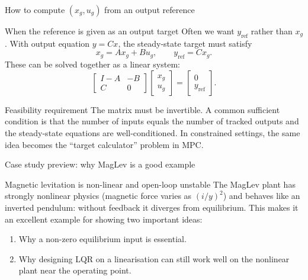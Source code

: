 \documentclass[aspectratio=169,11pt]{beamer}
\begin{document}
\begin{frame}{How to compute $(x_g,u_g)$ from an output reference}
\begin{block}{When the reference is given as an output target}
Often we want $y_{\mathrm{ref}}$ rather than $x_g$. With output equation $y=Cx$, the steady-state target must satisfy
\[
x_g = Ax_g + Bu_g,\qquad y_{\mathrm{ref}} = Cx_g.
\]
These can be solved together as a linear system:
\[
\begin{bmatrix} I-A & -B\\ C & 0\end{bmatrix}
\begin{bmatrix} x_g\\ u_g\end{bmatrix}
=
\begin{bmatrix} 0\\ y_{\mathrm{ref}}\end{bmatrix}.
\]
\end{block}

\begin{alertblock}{Feasibility requirement}
The matrix must be invertible. A common sufficient condition is that the number of inputs equals the number of tracked outputs and the steady-state equations are well-conditioned.
In constrained settings, the same idea becomes the ``target calculator'' problem in MPC.
\end{alertblock}
\end{frame}

\begin{frame}{Case study preview: why MagLev is a good example}
\begin{block}{Magnetic levitation is non-linear and open-loop unstable}
The MagLev plant has strongly nonlinear physics (magnetic force varies as $(i/y)^2$) and behaves like an inverted pendulum: without feedback it diverges from equilibrium.
This makes it an excellent example for showing two important ideas:
\begin{enumerate}
  \item Why a non-zero equilibrium input is essential.
  \item Why designing LQR on a linearisation can still work well on the nonlinear plant near the operating point.
\end{enumerate}
\end{block}
\end{frame}
\end{document}
